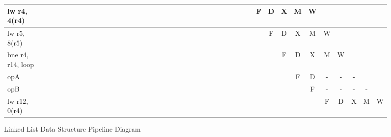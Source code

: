 \documentclass[10pt]{article}
\begin{document}
\begin{figure}[H]
{\begin{tabular}{|l|c|c|c|c!{\vrule width 1.5pt}c|c|c|c|c|c|c|c|c|c|c|c|c|c|c|c|c|c!{\vrule width 1.5pt}c|c|c|c|c|c|c|c|c|c|c|c|c|c|c|c|c|c!{\vrule width 1.5pt}c|}
lw r4, 4(r4)      &   &   &   &   &   &   &   &   &   &    &    &    &    &    &    &    &    &    &    &    &    &    &    &    &    &    &    &    &    &    &    & F  & D  & X  & M  & W  &    &    &    &    &    \\ \hline
lw r5, 8(r5)      &   &   &   &   &   &   &   &   &   &    &    &    &    &    &    &    &    &    &    &    &    &    &    &    &    &    &    &    &    &    &    &    & F  & D  & X  & M  & W  &    &    &    &    \\ \hline
bne r4, r14, loop &   &   &   &   &   &   &   &   &   &    &    &    &    &    &    &    &    &    &    &    &    &    &    &    &    &    &    &    &    &    &    &    &    & F  & D  & X  & M  & W  &    &    &    \\ \hline
opA               &   &   &   &   &   &   &   &   &   &    &    &    &    &    &    &    &    &    &    &    &    &    &    &    &    &    &    &    &    &    &    &    &    &    & F  & D  & -  & -  & -  &    &    \\ \hline
opB               &   &   &   &   &   &   &   &   &   &    &    &    &    &    &    &    &    &    &    &    &    &    &    &    &    &    &    &    &    &    &    &    &    &    &    & F  & -  & -  & -  & -  &    \\ \hline
lw r12, 0(r4)     &   &   &   &   &   &   &   &   &   &    &    &    &    &    &    &    &    &    &    &    &    &    &    &    &    &    &    &    &    &    &    &    &    &    &    &    & F  & D  & X  & M  & W  \\ \hline
\end{tabular}
}
\caption{Linked List Data Structure Pipeline Diagram}
\end{figure}
\end{document}
